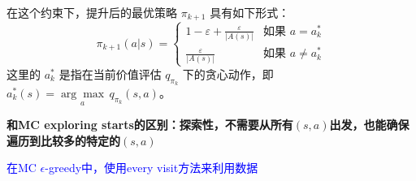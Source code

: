 \documentclass{article}
\begin{document}
在这个约束下，提升后的最优策略 $\pi_{k+1}$ 具有如下形式：
\[
\pi_{k+1}(a|s) =
\begin{cases}
  1 - \varepsilon + \frac{\varepsilon}{|A(s)|} & \text{如果 } a = a_k^* \\
  \frac{\varepsilon}{|A(s)|} & \text{如果 } a \neq a_k^*
\end{cases}
\]
这里的 $a_k^*$ 是指在当前价值评估 $q_{\pi_k}$ 下的贪心动作，即 $a_k^*(s) = \underset{a}{\arg\max} \, q_{\pi_k}(s, a)$。

\textbf{和MC exploring starts的区别：探索性，不需要从所有$(s,a)$出发，也能确保遍历到比较多的特定的$(s,a)$}

\textcolor{blue}{\kaishu*在MC $\epsilon$-greedy中，使用every visit方法来利用数据}
\end{document}
